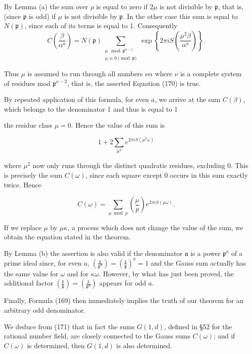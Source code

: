 By Lemma (a) the sum over $\rho$ is equal to zero if $2\mu$ is not divisible by $\mathfrak{p}$, that is, (since $\mathfrak{p}$ is odd) if $\mu$ is not divisible by $\mathfrak{p}$. In the other case this sum is equal to $N(\mathfrak{p})$, since each of its terms is equal to 1. Consequently
$$C\left(\frac{\beta}{\alpha^a}\right) = N(\mathfrak{p}) \sum_{\substack{\mu \mod \mathfrak{p}^{a-1} \\ \mu \equiv 0 \pmod{\mathfrak{p}}}} \exp\left\{2\pi i S\left(\frac{\mu^2\beta}{\alpha^a}\right)\right\}.$$

Thus $\mu$ is assumed to run through all numbers $\nu\alpha$ where $\nu$ is a complete system of residues mod $\mathfrak{p}^{a-2}$, that is, the asserted Equation (170) is true.

By repeated application of this formula, for even $a$, we arrive at the sum $C(\beta)$, which belongs to the denominator 1 and thus is equal to 1

the residue class $\mu = 0$. Hence the value of this sum is

$$1 + 2 \sum_{\mu^2} e^{2\pi i S(\mu^2 \omega)}$$

where $\mu^2$ now only runs through the distinct quadratic residues, excluding 0. This is precisely the sum $C(\omega)$, since each square except 0 occurs in this sum exactly twice. Hence

$$C(\omega) = \sum_{\mu \bmod p} \left( \frac{\mu}{p} \right) e^{2\pi i S(\mu \omega)}. \tag{171}$$

If we replace $\mu$ by $\mu \kappa$, a process which does not change the value of the sum, we obtain the equation stated in the theorem.

By Lemma (b) the assertion is also valid if the denominator $\mathfrak{a}$ is a power $\mathfrak{p}^a$ of a prime ideal since, for even $a$, $\left( \frac{\mathfrak{x}}{\mathfrak{p}^a} \right) = \left( \frac{\mathfrak{x}}{\mathfrak{p}} \right)^a = 1$ and the Gauss sum actually has the same value for $\omega$ and for $\kappa \omega$. However, by what has just been proved, the additional factor $\left( \frac{\mathfrak{x}}{\mathfrak{p}} \right) = \left( \frac{\mathfrak{x}}{\mathfrak{p}^a} \right)$ appears for odd $a$.

Finally, Formula (169) then immediately implies the truth of our theorem for an arbitrary odd denominator.

We deduce from (171) that in fact the sums $G(1, d)$, defined in §52 for the rational number field, are closely connected to the Gauss sums $C(\omega)$; and if $C(\omega)$ is determined, then $G(1, d)$ is also determined.

